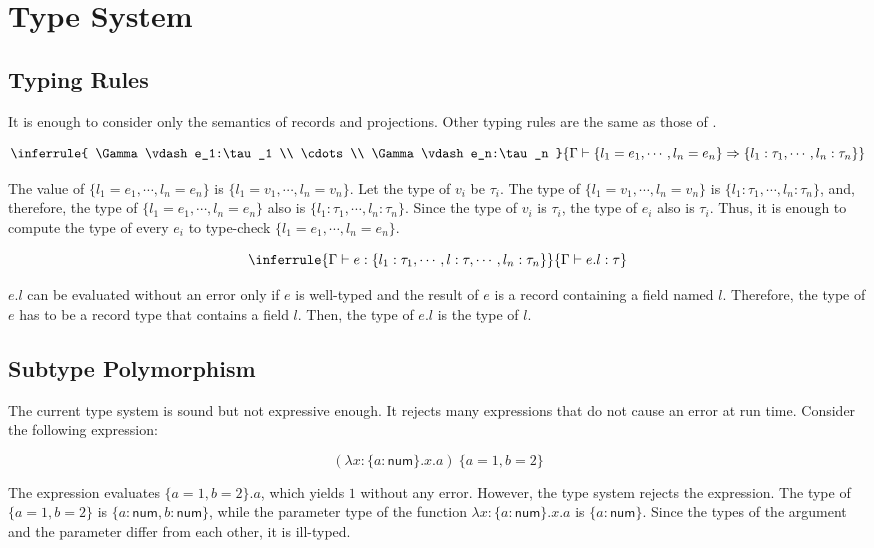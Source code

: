\section{Type System}

\subsection{Typing Rules}

It is enough to consider only the semantics of records and projections. Other
typing rules are the same as those of \lang.

\[
\inferrule
{ \Gamma\vdash e_1:\tau_1 \\ \cdots \\ \Gamma\vdash e_n:\tau_n }
{ \Gamma\vdash
\{l_1=e_1,\cdots,l_n=e_n\}\Rightarrow\{l_1:\tau_1,\cdots,l_n:\tau_n\} }
\]

The value of $\{l_1=e_1,\cdots,l_n=e_n\}$ is $\{l_1=v_1,\cdots,l_n=v_n\}$.
Let the type of $v_i$ be $\tau_i$. The type of
$\{l_1=v_1,\cdots,l_n=v_n\}$ is $\{l_1:\tau_1,\cdots,l_n:\tau_n\}$, and,
therefore, the type of $\{l_1=e_1,\cdots,l_n=e_n\}$ also is
$\{l_1:\tau_1,\cdots,l_n:\tau_n\}$. Since the type of $v_i$ is $\tau_i$,
the type of $e_i$ also is $\tau_i$. Thus, it is enough to compute the type
of every $e_i$ to type-check $\{l_1=e_1,\cdots,l_n=e_n\}$.

\[
\inferrule
{ \Gamma\vdash e:\{l_1:\tau_1,\cdots,l:\tau,\cdots,l_n:\tau_n\} }
{ \Gamma\vdash e.l: \tau }
\]

$e.l$ can be evaluated without an error only if $e$ is well-typed and the
result of $e$ is a record containing a field named $l$. Therefore, the type
of $e$ has to be a record type that contains a field $l$. Then, the type of
$e.l$ is the type of $l$.

\subsection{Subtype Polymorphism}

The current type system is sound but not expressive enough. It rejects many
expressions that do not cause an error at run time. Consider the following
expression:

\[
(\lambda x:\{a:\textsf{num}\}.x.a)\ \{a=1,b=2\}
\]

The expression evaluates $\{a=1,b=2\}.a$, which yields $1$ without any
error. However, the type system rejects the expression. The type of
$\{a=1,b=2\}$ is $\{a:\textsf{num},b:\textsf{num}\}$, while the parameter type of
the function $\lambda x:\{a:\textsf{num}\}.x.a$ is $\{a:\textsf{num}\}$. Since the
types of the argument and the parameter differ from each other, it is ill-typed.

